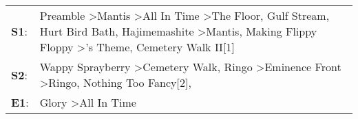 \begin{supertabular}{p{0.03\textwidth}p{0.92\textwidth}}
 \textbf{S1}:  &  Preamble\textsuperscript{} \textgreater \enspace Mantis\textsuperscript{} \textgreater \enspace All In Time\textsuperscript{} \textgreater \enspace The Floor\textsuperscript{}, \enspace Gulf Stream\textsuperscript{}, \enspace Hurt Bird Bath\textsuperscript{}, \enspace Hajimemashite\textsuperscript{} \textgreater \enspace Mantis\textsuperscript{}, \enspace Making Flippy Floppy\textsuperscript{} \textgreater {}'s Theme\textsuperscript{}, \enspace Cemetery Walk II[1]\textsuperscript{}  \enspace  \\
 \textbf{S2}:  &                                                                                                                                                                                                Wappy Sprayberry\textsuperscript{} \textgreater \enspace Cemetery Walk\textsuperscript{}, \enspace Ringo\textsuperscript{} \textgreater \enspace Eminence Front\textsuperscript{} \textgreater \enspace Ringo\textsuperscript{}, \enspace Nothing Too Fancy[2]\textsuperscript{}, \textsuperscript{}  \enspace  \\
 \textbf{E1}:  &                                                                                                                                                                                                                                                                                                                                                                                                                                      Glory\textsuperscript{} \textgreater \enspace All In Time\textsuperscript{}  \enspace  \\
\end{supertabular}
